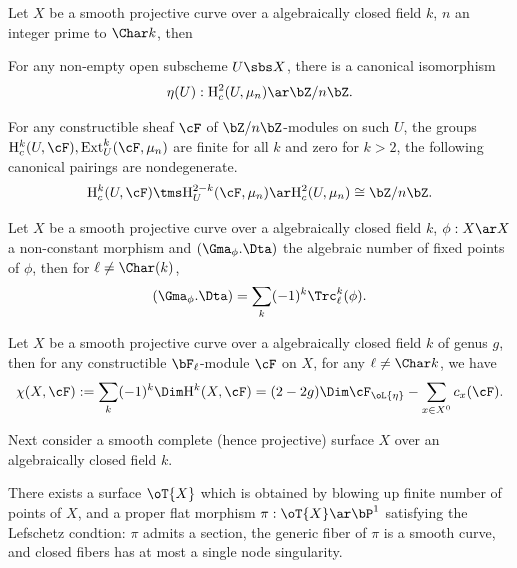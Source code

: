 \documentclass[a4paper, twoside]{article}
\begin{document}
\begin{thm}
  Let $X$ be a smooth projective curve over a algebraically closed field $k$, $n$ an integer prime to $\Char k$, then
  \begin{enr}
    \item For any non-empty open subscheme $U\sbs X$, there is a canonical isomorphism
    \[
      \eta(U):\mathrm{H}_{c}^{2}(U,\mu_{n})\ar\bZ/n\bZ.
    \]
    \item For any constructible sheaf $\cF$ of $\bZ/n\bZ$-modules on such $U$, the groups $\mathrm{H}_{c}^{k}(U,\cF),\mathrm{Ext}_{U}^{k}(\cF,\mu_{n})$ are finite for all $k$ and zero for $k>2$, the following canonical pairings are nondegenerate.
    \[
      \mathrm{H}_{c}^{k}(U,\cF)\tms \mathrm{H}_{U}^{2-k}(\cF,\mu_{n})\ar \mathrm{H}_{c}^{2}(U,\mu_{n})\cong\bZ/n\bZ.
    \]
  \end{enr}
\end{thm}

\begin{thm}
  Let $X$ be a smooth projective curve over a algebraically closed field $k$, $\phi:X\ar X$ a non-constant morphism and $(\Gma_{\phi}.\Dta)$ the algebraic number of fixed points of $\phi$, then for $\ell\neq\Char(k)$,
  \[
    (\Gma_{\phi}.\Dta)=\sum_{k}(-1)^{k}\Trc_{\ell}^{k}(\phi).
  \]
\end{thm}

\begin{thm}
  Let $X$ be a smooth projective curve over a algebraically closed field $k$ of genus $g$, then for any constructible $\bF_{\ell}$-module $\cF$ on $X$, for any $\ell\neq \Char k$, we have
  \[
    \chi(X,\cF):=\sum_{k}(-1)^{k}\Dim \mathrm{H}_{}^{k}(X,\cF)=(2-2g)\Dim\cF_{\oL{\eta}}-\sum_{x\in X^{0}}c_{x}(\cF).
  \]
\end{thm}

\begin{stp}
  Next consider a smooth complete (hence projective) surface $X$ over an algebraically closed field $k$.
\end{stp}

\begin{thm}
  There exists a surface $\oT{X}$ which is obtained by blowing up finite number of points of $X$, and a proper flat morphism $\pi:\oT{X}\ar\bP^{1}$ satisfying the Lefschetz condtion: $\pi$ admits a section, the generic fiber of $\pi$ is a smooth curve, and closed fibers has at most a single node singularity.
\end{thm}
\end{document}
